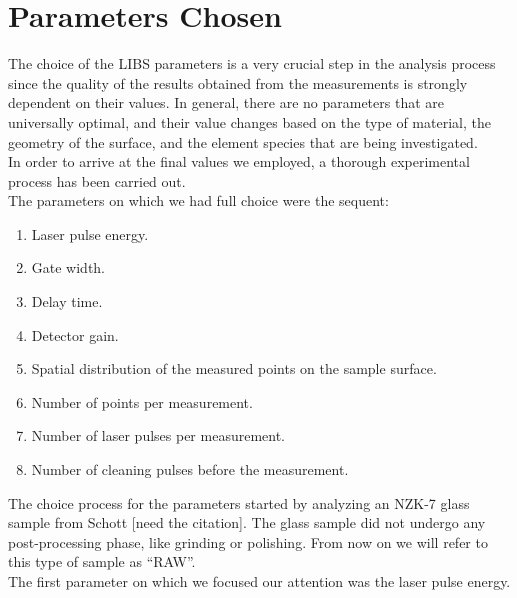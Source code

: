 \section{Parameters Chosen}
\label{sec:parameters_chosen}
The choice of the LIBS parameters is a very crucial step in the analysis process since the quality of the results obtained from the measurements is strongly dependent on their values. In general, there are no parameters that are universally optimal, and their value changes based on the type of material, the geometry of the surface, and the element species that are being investigated.
\\
In order to arrive at the final values we employed, a thorough experimental process has been carried out.
\\
The parameters on which we had full choice were the sequent:
\begin{enumerate}
    \item Laser pulse energy.
    \item Gate width.
    \item Delay time.
    \item Detector gain.
    \item Spatial distribution of the measured points on the sample surface.
    \item Number of points per measurement.
    \item Number of laser pulses per measurement.
    \item Number of cleaning pulses before the measurement.
\end{enumerate}
The choice process for the parameters started by analyzing an NZK-7 glass sample from Schott [need the citation]. The glass sample did not undergo any post-processing phase, like grinding or polishing. From now on we will refer to this type of sample as “RAW”.
\\
The first parameter on which we focused our attention was the laser pulse energy. 
